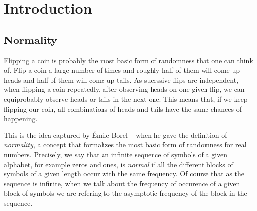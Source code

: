 \documentclass[11pt,a4paper]{tesis}
\theoremstyle{definition}
\begin{document}

\def\autor{Lucas Puterman}
\def\tituloTesis{Números Muy Normales}
\def\runtitulo{Números Muy Normales}
\def\runtitle{Very Normal Numbers}
\def\director{Dra. Verónica Becher}
\def\codirector{Olivier Carton}
\def\lugar{Buenos Aires, 2019}


\frontmatter
\pagestyle{empty}


\cleardoublepage


\cleardoublepage

\cleardoublepage
\tableofcontents

\mainmatter
\pagestyle{headings}


\chapter{Introduction}


\section{Normality}

Flipping a coin is probably the most basic form of randomness that one can think of. Flip a coin a large number of times and roughly half of them will come up heads and half of them will come up tails.
As sucessive flips are independent, when flipping a coin repeatedly, after observing heads on one given flip, we can equiprobably observe heads or tails in the next one. This means that, if we keep flipping our coin, all combinations of heads and tails have the same chances of happening.

This is the idea captured by Émile Borel  ~\cite{Borel} when he gave the definition of \textit{normality}, a concept that formalizes  the most basic form of randomness for real numbers. Precisely, we say that an infinite sequence of symbols of a given alphabet, for example zeros and ones, is \textit{normal} if all the different blocks of symbols of a given length occur with the same frequency.
Of course that as the sequence is infinite, when we talk about the frequency of occurence of a given block of symbols we are refering to the asymptotic frequency of the block in the sequence.
\end{document}
